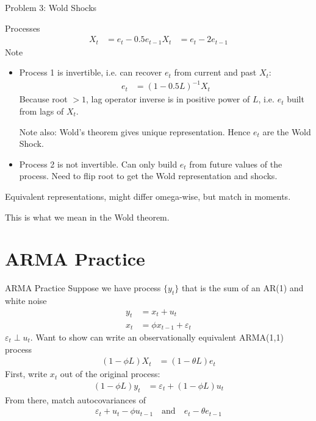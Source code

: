 \documentclass[handout]{beamer}
\begin{document}
\begin{frame}[shrink]{Problem 3: Wold Shocks}

Processes
\begin{align*}
  X_t &= e_t - 0.5 e_{t-1}
  X_t &= e_t - 2 e_{t-1}
\end{align*}
Note
\begin{itemize}
  \item Process 1 is \alert{invertible}, i.e. can recover $e_t$ from
    current and past $X_t$:
    \begin{align*}
      e_t &= (1-0.5L)^{-1}X_t
    \end{align*}
    Because root $>1$, lag operator inverse is in positive power of $L$,
    i.e. $e_t$ built from lags of $X_t$.

    Note also: Wold's theorem gives \alert{unique} representation.
    Hence $e_t$ are the Wold Shock.

  \item
    Process 2 is \alert{not} invertible.
    Can only build $e_t$ from future values of the process.
    Need to flip root to get the Wold representation and shocks.

\end{itemize}

\end{frame}


\begin{frame}[shrink]
Equivalent representations, might differ omega-wise, but match in
moments.

This is what we mean in the Wold theorem.
\end{frame}




\section{ARMA Practice}


\begin{frame}[shrink]{ARMA Practice}
Suppose we have process $\{y_t\}$ that is the sum of an AR(1) and white
noise
\begin{align*}
  y_t &= x_t + u_t\\
  x_t &=\phi x_{t-1} + \varepsilon_t
\end{align*}
$\varepsilon_t\perp u_t$.
Want to show can write an observationally equivalent ARMA(1,1) process
\begin{align*}
  (1-\phi L)X_t &= (1-\theta L)e_t
\end{align*}
First, write $x_t$ out of the original process:
\begin{align*}
  (1-\phi L)y_t &= \varepsilon_t + (1-\phi L)u_t
\end{align*}
From there, match autocovariances of
\begin{align*}
  \varepsilon_t+u_t-\phi u_{t-1}
  \quad\text{and}\quad
  e_t - \theta e_{t-1}
\end{align*}
\end{frame}
\end{document}
